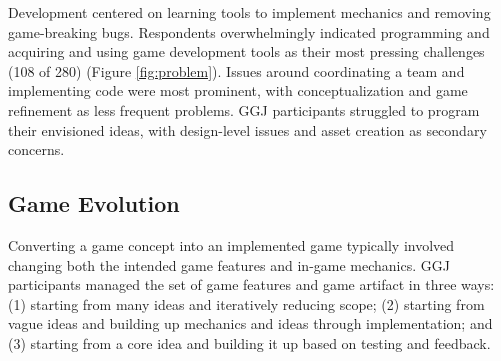 \documentclass{sig-alternate}
\begin{document}
Development centered on learning tools to implement mechanics and removing game-breaking bugs. 
Respondents overwhelmingly indicated programming and acquiring and using game development tools as their most pressing challenges (108 of 280) (Figure \ref{fig:problem}).
Issues around coordinating a team and implementing code were most prominent, with conceptualization and game refinement as less frequent problems.
GGJ participants struggled to program their envisioned ideas, with design-level issues and asset creation as secondary concerns.




\subsection{Game Evolution}
Converting a game concept into an implemented game typically involved changing both the intended game features and in-game mechanics. 
GGJ participants managed the set of game features and game artifact in three ways:
(1) starting from many ideas and iteratively reducing scope;
(2) starting from vague ideas and building up mechanics and ideas through implementation;
and
(3) starting from a core idea and building it up based on testing and feedback.
\end{document}

